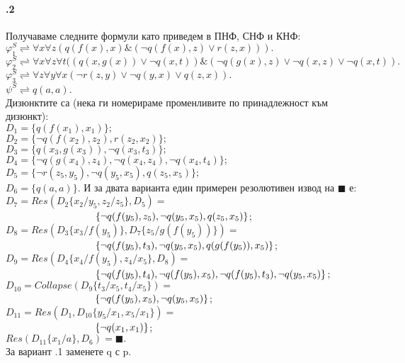 \documentclass[]{article}
\begin{document}
\paragraph{\hspace{0.5em} .2}
\begin{addmargin}[1em]{2em}
Получаваме следните формули като приведем в ПНФ, СНФ и КНФ: \\
$\varphi_1^S \rightleftharpoons \forall x \forall z (q(f(x), x)\&(\neg q(f(x), z)\lor r(z, x))). $ \\
$\varphi_2^S \rightleftharpoons \forall x \forall z \forall t((q(x,g(x))\lor \neg q(x,t))\&(\neg q(g(x),z) \lor \neg q(x, z) \lor \neg q(x, t)). $ \\
$\varphi_3^S \rightleftharpoons \forall z \forall y \forall x (\neg r(z,y) \lor \neg q(y,x) \lor q(z, x)). $ \\
$\psi^S \rightleftharpoons q(a,a).$ \\
Дизюнктите са (нека ги номерираме променливите по принадлежност към дизюнкт): \\
$D_1 = \{ q(f(x_1),x_1)\};$ \\
$D_2 = \{ \neg q(f(x_2),z_2), r(z_2, x_2)\};$ \\
$D_3 = \{ q(x_3, g(x_3)), \neg q(x_3, t_3)\};$ \\
$D_4 = \{ \neg q(g(x_4),z_4), \neg q(x_4, z_4), \neg q(x_4, t_4)\};$ \\
$D_5 = \{ \neg r(z_5, y_5), \neg q(y_5, x_5), q(z_5, x_5)\};$ \\
$D_6 = \{ q(a,a)\}.$ 
\vskip 0.1in
И за двата варианта един примерен резолютивен извод на $ \blacksquare $ е: \\
$ D_7 = Res(D_2\{x_2/y_5, z_2/z_5\}, D_5) = $\\$ \indent \indent \indent \indent \indent \indent \{ \neg q(f(y_5),z_5), \neg q(y_5, x_5), q(z_5, x_5) \}$; \\
$ D_8 = Res(D_3\{x_3/f(y_5)\}, D_7\{ z_5/g(f(y_5)) \}) = $\\$ \indent \indent \indent \indent \indent \indent \{ \neg q(f(y_5), t_3), \neg q(y_5, x_5), q(g(f(y_5)),x_5)\}$; \\
$ D_9 = Res(D_4\{x_4/f(y_5), z_4/x_5\}, D_8) = $\\$  \indent \indent \indent \indent \indent \indent \{ \neg q(f(y_5),t_4), \neg q(f(y_5),x_5), \neg q(f(y_5), t_3), \neg q(y_5, x_5)\}$;\\
$ D_{10} = Collapse(D_9\{t_3/x_5, t_4/x_5\}) = $\\$  \indent \indent \indent \indent \indent \indent\{\neg q(f(y_5), x_5), \neg q(y_5, x_5)\}$;\\
$ D_{11} = Res(D_1, D_{10}\{y_5/x_1, x_5/x_1 \}) = $\\$  \indent \indent \indent \indent \indent \indent  \{ \neg q(x_1, x_1) \}$;\\
$ Res(D_{11}\{x_1/a\}, D_6) = \blacksquare. $ \\

За вариант .1 заменете q с p.
\end{addmargin}
\end{document}
